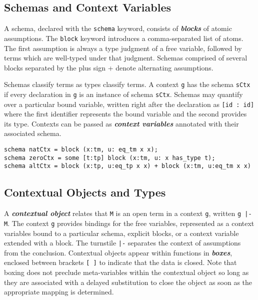 \documentclass[11pt]{article}
\begin{document}
\subsection{Schemas and Context Variables}
A schema, declared with the \verb+schema+ keyword, consists of \textbf{\textit{blocks}} of atomic assumptions.
The \verb+block+ keyword introduces a comma-separated list of atoms.
The first assumption is always a type judgment of a free variable, followed by terms which are well-typed under that judgment.
Schemas comprised of several blocks separated by the plus sign \verb+++ denote alternating assumptions.

Schemas classify terms as types classify terms.
A context \verb+g+ has the schema \verb+sCtx+ if every declaration in \verb+g+ is an instance of schema \verb+sCtx+.
Schemas may quantify over a particular bound variable, written right after the declaration as \verb+[id : id]+ where the first identifier represents the bound variable and the second provides its type.
Contexts can be passed as \textit{\textbf{context variables}} annotated with their associated schema.

\begin{verbatim}
schema natCtx = block (x:tm, u: eq_tm x x);
schema zeroCtx = some [t:tp] block (x:tm, u: x has_type t);
schema altCtx = block (x:tp, u:eq_tp x x) + block (x:tm, u:eq_tm x x)
\end{verbatim}


\subsection{Contextual Objects and Types}
A \textit{\textbf{contextual object}} relates that \verb+M+ is an open term in a context \verb+g+, written \verb+g |- M+.
The context \verb+g+ provides bindings for the free variables, represented as a context variables bound to a particular schema, explicit blocks, or a context variable extended with a block.
The turnstile \verb+|-+ separates the context of assumptions from the conclusion.
Contextual objects appear within functions in \textit{\textbf{boxes}}, enclosed between brackets \verb+[ ]+ to indicate that the data is closed.
Note that boxing does not preclude meta-variables within the contextual object so long as they are associated with a delayed substitution to close the object as soon as the appropriate mapping is determined.
\end{document}
